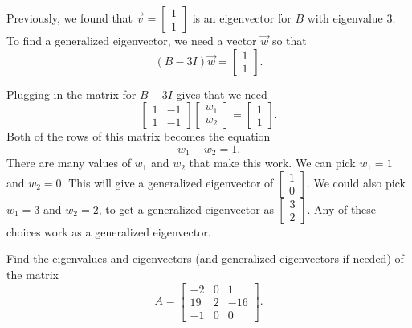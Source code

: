 \begin{exampleSol}
Previously, we found that $\vec{v} = \begin{bmatrix}1 \\ 1 \end{bmatrix}$ is an eigenvector for $B$ with eigenvalue $3$. To find a generalized eigenvector, we need a vector $\vec{w}$ so that
\[ (B - 3I)\vec{w} = \begin{bmatrix}1 \\ 1 \end{bmatrix}. \] 

Plugging in the matrix for $B - 3I$ gives that we need
\[ \begin{bmatrix} 1 & -1 \\ 1 & -1 \end{bmatrix} \begin{bmatrix} w_1 \\ w_2 \end{bmatrix} = \begin{bmatrix} 1 \\ 1 \end{bmatrix}. \] Both of the rows of this matrix becomes the equation
\[ w_1 - w_2 = 1. \]
There are many values of $w_1$ and $w_2$ that make this work. We can pick $w_1 = 1$ and $w_2 = 0$. This will give a generalized eigenvector of $\begin{bmatrix} 1 \\ 0 \end{bmatrix}$. We could also pick $w_1 = 3$ and $w_2 = 2$, to get a generalized eigenvector as $\begin{bmatrix} 3 \\ 2 \end{bmatrix}$. Any of these choices work as a generalized eigenvector.
\end{exampleSol}

\begin{example}
Find the eigenvalues and eigenvectors (and generalized eigenvectors if needed) of the matrix 
\[ A = \begin{bmatrix} -2 & 0 & 1 \\ 19 & 2 & -16 \\ -1 & 0 & 0 \end{bmatrix}. \]
\end{example}

